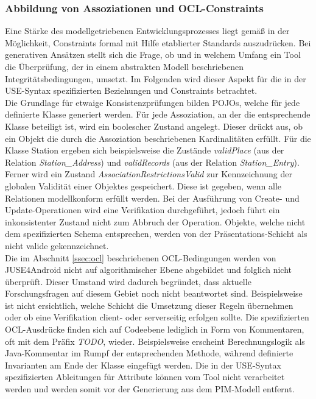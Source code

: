 \documentclass[a4paper,twoside]{article}
\begin{document}
\subsubsection{Abbildung von Assoziationen und OCL-Constraints}
Eine Stärke des modellgetriebenen Entwicklungsprozesses liegt gemäß \cite{SWOT} in der Möglichkeit, Constraints formal mit Hilfe etablierter Standards auszudrücken. Bei generativen Ansätzen stellt sich die Frage, ob und in welchem Umfang ein Tool die Überprüfung, der in einem abstrakten Modell beschriebenen Integritätsbedingungen, umsetzt. Im Folgenden wird dieser Aspekt für die in der USE-Syntax spezifizierten Beziehungen und Constraints betrachtet. 
\\

Die Grundlage für etwaige Konsistenzprüfungen bilden POJOs, welche für jede definierte Klasse generiert werden. Für jede Assoziation, an der die entsprechende Klasse beteiligt ist, wird ein boolescher Zustand angelegt. Dieser drückt aus, ob ein Objekt die durch die Assoziation beschriebenen Kardinalitäten erfüllt. Für die Klasse Station ergeben sich beispielsweise die Zustände \textit{validPlace} (aus der Relation \textit{Station\_Address}) und \textit{validRecords} (aus der Relation \textit{Station\_Entry}). Ferner wird ein Zustand \textit{AssociationRestrictionsValid} zur Kennzeichnung der globalen Validität einer Objektes gespeichert. Diese ist gegeben, wenn alle Relationen modellkonform erfüllt werden. Bei der Ausführung von Create- und Update-Operationen wird eine Verifikation durchgeführt, jedoch führt ein inkonsistenter Zustand nicht zum Abbruch der Operation. Objekte, welche nicht dem spezifizierten Schema entsprechen, werden von der Präsentations-Schicht als nicht valide gekennzeichnet.
\\

Die im Abschnitt \ref{ssec:ocl} beschriebenen OCL-Bedingungen werden von JUSE4Android nicht auf algorithmischer Ebene abgebildet und folglich nicht überprüft. \cite[S.59]{SilvaMasterThesis} Dieser Umstand wird dadurch begründet, dass aktuelle Forschungsfragen auf diesem Gebiet noch nicht beantwortet sind. Beispielsweise ist nicht ersichtlich, welche Schicht die Umsetzung dieser Regeln übernehmen oder ob eine Verifikation client- oder serverseitig erfolgen sollte. \cite[S.107]{SilvaMasterThesis} 
Die spezifizierten OCL-Ausdrücke finden sich auf Codeebene lediglich in Form von Kommentaren, oft mit dem Präfix \textit{TODO}, wieder. Beispielsweise erscheint Berechnungslogik als Java-Kommentar im Rumpf der entsprechenden Methode, während definierte Invarianten am Ende der Klasse eingefügt werden. Die in der USE-Syntax spezifizierten Ableitungen für Attribute können vom Tool nicht verarbeitet werden und werden somit vor der Generierung aus dem PIM-Modell entfernt. 
\end{document}
